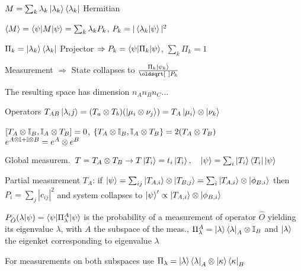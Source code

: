\begin{squishlist}
    \item $M = \sum_k \lambda_k \ket{\lambda_k} \bra{\lambda_k}$ Hermitian
    \item $\braket{M} = \braket{\psi|M|\psi} = \sum_k \lambda_k P_k$, $P_k = |\braket{\lambda_k | \psi}|^2$
    \item $\Pi_k = \ket{\lambda_k}\bra{\lambda_k}$ Projector $\Rightarrow P_k = \braket{\psi| \Pi_k | \psi}$, $\sum_k \Pi_k = 1$
    \item Measurement $\Rightarrow$ State collapses to $\frac{\Pi_k \ket{\psi_k}}{\sqrt{P_k}}$
\end{squishlist}

\begin{squishlist}
    \item The resulting space has dimension $n_A n_B n_C \ldots$
    \item Operators $T_{AB} \ket{\lambda_ij} = (T_a \otimes T_b) (\ket{\mu_i \otimes \nu_j}) = T_A \ket{\mu_i} \otimes \ket{\nu_k}$
    \item $[T_A \otimes \mathbb{I}_B, \mathbb{I}_A \otimes T_B] = 0$, \quad $\{ T_A \otimes \mathbb{I}_B, \mathbb{I}_A \otimes T_B\} = 2 (T_A \otimes T_B)$ \\
        $e^{A \otimes \mathbb{I} + \mathbb{I} \otimes B} = e^A \otimes e^B$

    \item Global measurem.\ $T = T_A \otimes T_B \rightarrow T \ket{T_i} = t_i \ket{T_i}, \quad \ket{\psi} = \sum_i \ket{T_i} \bra{T_i}\ket{\psi}$ 
    \item Partial measurement $T_A$: if $\ket{\psi} = \sum_{ij} \ket{T_{A,i}} \otimes \ket{T_{B,j}} = \sum_i \ket{T_{A,i}} \otimes \ket{\phi_{B,i}}$
        then $P_i = \sum_j |c_{ij}|^2$ and system collapses to $\ket{\psi}' \propto \ket{T_{A,i}} \otimes \ket{\phi_{B,i}}$

    \item $P_{\hat{O}}(\lambda | \psi) = \braket{\psi | \Pi^{A}_{\lambda} | \psi }$ is the probability of a measurement of operator $\hat{O}$ yielding its eigenvalue $\lambda$, with $A$ the subspace of the meas., $\Pi_{\lambda}^A = \ket{\lambda}\bra{\lambda}_A \otimes \mathbb{I}_B$ and
    $\ket{\lambda}$ the eigenket corresponding to eigenvalue $\lambda$

    For measurements on both subspaces use $\Pi_{\lambda} = \ket{\lambda}\bra{\lambda}_A \otimes \ket{\kappa}\bra{\kappa}_B$


\end{squishlist}
